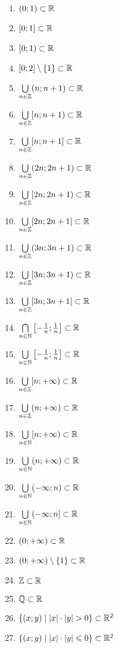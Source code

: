 \begin{enumerate}
	\item
		$(0;1)\subset\mathbb{R}$
	\item
		$[0;1]\subset\mathbb{R}$
	\item
		$[0;1)\subset\mathbb{R}$
	\item
		$[0;2]\setminus\{1\}\subset\mathbb{R}$
	\item
		$\bigcup\limits_{n\in\mathbb{Z}}(n;n+1)\subset\mathbb{R}$
	\item
		$\bigcup\limits_{n\in\mathbb{Z}}[n;n+1)\subset\mathbb{R}$
	\item
		$\bigcup\limits_{n\in\mathbb{Z}}[n;n+1]\subset\mathbb{R}$
	\item
		$\bigcup\limits_{n\in\mathbb{Z}}(2n;2n+1)\subset\mathbb{R}$
	\item
		$\bigcup\limits_{n\in\mathbb{Z}}[2n;2n+1)\subset\mathbb{R}$
	\item
		$\bigcup\limits_{n\in\mathbb{Z}}[2n;2n+1]\subset\mathbb{R}$
	\item
		$\bigcup\limits_{n\in\mathbb{Z}}(3n;3n+1)\subset\mathbb{R}$
	\item
		$\bigcup\limits_{n\in\mathbb{Z}}[3n;3n+1)\subset\mathbb{R}$
	\item
		$\bigcup\limits_{n\in\mathbb{Z}}[3n;3n+1]\subset\mathbb{R}$
	\item
		$\bigcap\limits_{n\in\mathbb{N}}\left[-\frac{1}{n};\frac{1}{n}\right]\subset\mathbb{R}$
	\item
		$\bigcup\limits_{n\in\mathbb{N}}\left[-\frac{1}{n};\frac{1}{n}\right]\subset\mathbb{R}$
	\item
		$\bigcup\limits_{n\in\mathbb{Z}}[n;+\infty)\subset\mathbb{R}$
	\item
		$\bigcup\limits_{n\in\mathbb{Z}}(n;+\infty)\subset\mathbb{R}$
	\item
		$\bigcup\limits_{n\in\mathbb{N}}[n;+\infty)\subset\mathbb{R}$
	\item
		$\bigcup\limits_{n\in\mathbb{N}}(n;+\infty)\subset\mathbb{R}$
	\item
		$\bigcup\limits_{n\in\mathbb{N}}(-\infty;n)\subset\mathbb{R}$
	\item
		$\bigcup\limits_{n\in\mathbb{N}}(-\infty;n]\subset\mathbb{R}$
	\item
		$(0;+\infty)\subset\mathbb{R}$
	\item
		$(0;+\infty)\setminus\{1\}\subset\mathbb{R}$
	\item
		$\mathbb{Z}\subset \mathbb{R}$
	\item
		$\mathbb{Q}\subset \mathbb{R}$
	\item
		$\{(x;y) \mid |x|\cdot |y| > 0\}\subset\mathbb{R}^2$
	\item
		$\{(x;y) \mid |x|\cdot |y| \leqslant 0\}\subset\mathbb{R}^2$

\end{enumerate}
